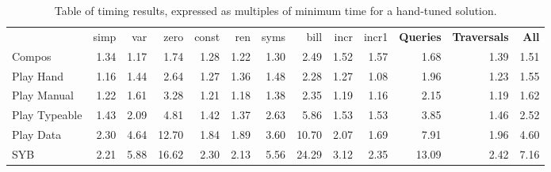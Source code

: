 \documentclass[preprint]{sigplanconf}
\begin{document}
\begin{table}
\caption{Table of timing results, expressed as multiples of minimum time for a hand-tuned solution.}
\label{fig:results}
\vspace{3mm}
\begin{tabular*}{\textwidth}{lrrrrrrrrrrrr}
 & simp & var & zero & const & ren & syms & bill & incr & incr1 & \textbf{Queries} & \textbf{Traversals} & \textbf{All} \\
Compos         &  1.34 &  1.17 &  1.74 &  1.28 &  1.22 &  1.30 &  2.49 &  1.52 &  1.57 &  1.68 &  1.39 &  1.51 \\
Play Hand      &  1.16 &  1.44 &  2.64 &  1.27 &  1.36 &  1.48 &  2.28 &  1.27 &  1.08 &  1.96 &  1.23 &  1.55 \\
Play Manual    &  1.22 &  1.61 &  3.28 &  1.21 &  1.18 &  1.38 &  2.35 &  1.19 &  1.16 &  2.15 &  1.19 &  1.62 \\
Play Typeable  &  1.43 &  2.09 &  4.81 &  1.42 &  1.37 &  2.63 &  5.86 &  1.53 &  1.53 &  3.85 &  1.46 &  2.52 \\
Play Data      &  2.30 &  4.64 & 12.70 &  1.84 &  1.89 &  3.60 & 10.70 &  2.07 &  1.69 &  7.91 &  1.96 &  4.60 \\
SYB            &  2.21 &  5.88 & 16.62 &  2.30 &  2.13 &  5.56 & 24.29 &  3.12 &  2.35 & 13.09 &  2.42 &  7.16 \\
\hline
\end{tabular*}
\end{table}
\end{document}
